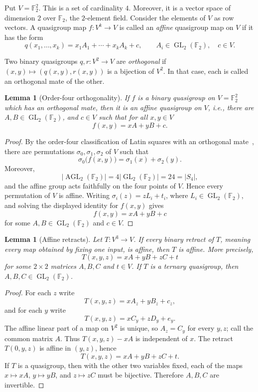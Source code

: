 \documentclass[preprint,12pt]{elsarticle}
\newtheorem{lemma}[theorem]{Lemma}
\theoremstyle{definition}
\newcommand{\F}{\mathbb F}
\newcommand{\GL}{\operatorname{GL}}
\begin{document}
Put $V = \F_2^2$. This is a set of cardinality $4$. Moreover, it is a vector
space of dimension $2$ over $\F_2$, the $2$-element field. Consider the elements of $V$ as row vectors. A quasigroup map
$f:V^k \rightarrow V$ is called an \emph{affine}  quasigroup map on $V$ if it has the form
\begin{equation}\label{eq:affine}
q(x_1,\ldots,x_k)=x_1A_1+\cdots+x_kA_k+c,
\qquad A_i\in\GL_2(\F_2),\quad c\in V.
\end{equation}

Two binary quasigroups $q,r:V^2\to V$ are \emph{orthogonal} if $(x,y)\mapsto(q(x,y),r(x,y))$ is a bijection of $V^2$. In that case, each is called an orthogonal mate of the other.

\begin{lemma}[Order-four orthogonality]\label{lem:orthogonal4}
If $f$ is a binary quasigroup on $V = \F_2^2$ which has an orthogonal mate, then
it is an affine quasigroup on $V$, i.e., there are $A,B \in \GL_2(\F_2)$, and 
$c \in V$ such that for all $x,y \in V$ 
\[
f(x,y)=xA+yB+c.
\]
\end{lemma}

\begin{proof}
By the order-four classification of Latin squares with an orthogonal
mate~\cite[Section~5]{EganWanless2016}, there are permutations
$\sigma_0,\sigma_1,\sigma_2$ of $V$ such that
\[
\sigma_0\bigl(f(x,y)\bigr)=\sigma_1(x)+\sigma_2(y).
\]
Moreover,
\[
|\operatorname{AGL}_2(\F_2)|=4|\GL_2(\F_2)|=24=|S_4|,
\]
and the affine group acts faithfully on the four points of $V$. Hence every
permutation of $V$ is affine. Writing
$\sigma_i(z)=zL_i+t_i$, where $L_i\in\GL_2(\F_2)$, and solving the displayed
identity for $f(x,y)$ gives
\[
f(x,y)=xA+yB+c
\]
for some $A,B\in\GL_2(\F_2)$ and $c\in V$.
\end{proof}

\begin{lemma}[Affine retracts]\label{lem:retract}
Let $T:V^3\to V$. If every binary retract of $T$, meaning every map obtained by fixing one input, is affine, then $T$ is affine. More precisely,
\[
T(x,y,z)=xA+yB+zC+t
\]
for some $2\times2$ matrices $A,B,C$ and $t\in V$. If $T$ is a ternary quasigroup, then $A,B,C\in\GL_2(\F_2)$.
\end{lemma}

\begin{proof}
For each $z$ write
\[
T(x,y,z)=xA_z+yB_z+c_z,
\]
and for each $y$ write
\[
T(x,y,z)=xC_y+zD_y+e_y.
\]
The affine linear part of a map on $V^2$ is unique, so $A_z=C_y$ for every $y,z$; call the common matrix $A$. Thus $T(x,y,z)-xA$ is independent of $x$. The retract $T(0,y,z)$ is affine in $(y,z)$, hence
\[
T(x,y,z)=xA+yB+zC+t.
\]
If $T$ is a quasigroup, then with the other two variables fixed, each of the maps $x\mapsto xA$, $y\mapsto yB$, and $z\mapsto zC$ must be bijective. Therefore $A,B,C$ are invertible.
\end{proof}
\end{document}
